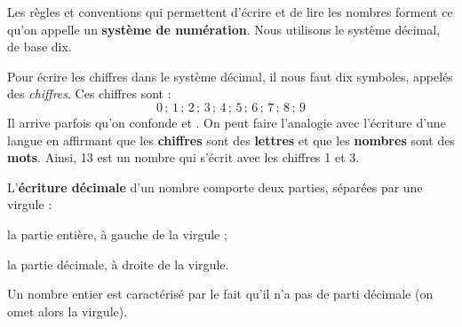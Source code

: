 

\begin{methode*1}

Les règles et conventions qui permettent d'écrire et de lire les nombres forment ce qu'on appelle un \textbf{système de numération}. Nous utilisons le système décimal, de base dix.

\begin{aconnaitre}
Pour écrire les chiffres dans le système décimal, il nous faut dix symboles, appelés des \emph{chiffres}. Ces chiffres sont :
\[ 0\,;\,1\,;\,2\,;\,3\,;\,4\,;\,5\,;\,6\,;\,7\,;\,8\,;\,9  \]
Il arrive parfois qu'on confonde \textbf{} et \textbf{}. On peut faire l'analogie avec l'écriture d'une langue en affirmant que les \textbf{\textcolor{H1}{chiffres}} sont des \textbf{\textcolor{H1}{lettres}} et que les \textbf{\textcolor{H1}{nombres}} sont des \textbf{\textcolor{H1}{mots}}. Ainsi, 13 est un nombre qui s'écrit avec les chiffres 1 et 3.
\end{aconnaitre}

\vspace{2em}

L'\textbf{\textcolor{C2}{écriture décimale}} d'un nombre comporte deux parties, séparées par une virgule :

\hspace{2em}\textbullet\hspace{.25em} la partie entière, à gauche de la virgule ;

\hspace{2em}\textbullet\hspace{.25em} la partie décimale, à droite de la virgule.



Un nombre entier est caractérisé par le fait qu'il n'a pas de parti décimale (on omet alors la virgule).

\vspace{2em}


\end{methode*1}

